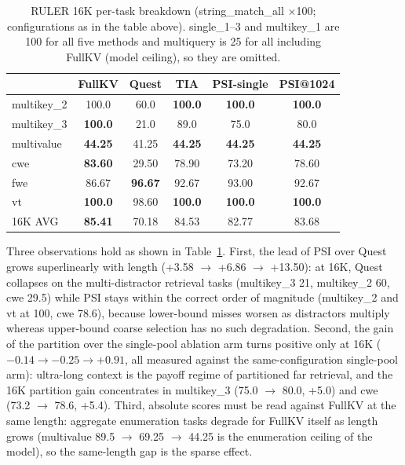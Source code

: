 \documentclass[11pt]{article}
\begin{document}
\begin{table}[h]\centering
\small\setlength{\tabcolsep}{4pt}
\caption{RULER 16K per-task breakdown (string\_match\_all $\times$100; configurations as in the table above). single\_1--3 and multikey\_1 are 100 for all five methods and multiquery is 25 for all including FullKV (model ceiling), so they are omitted.}
\label{tab:ruler16k}
\begin{tabular}{lccccc}
\toprule
 & FullKV & Quest & TIA & PSI-single & PSI@1024 \\
\midrule
multikey\_2 & 100.0 & 60.0 & \textbf{100.0} & \textbf{100.0} & \textbf{100.0} \\
multikey\_3 & \textbf{100.0} & 21.0 & 89.0 & 75.0 & 80.0 \\
multivalue & \textbf{44.25} & 41.25 & \textbf{44.25} & \textbf{44.25} & \textbf{44.25} \\
cwe & \textbf{83.60} & 29.50 & 78.90 & 73.20 & 78.60 \\
fwe & 86.67 & \textbf{96.67} & 92.67 & 93.00 & 92.67 \\
vt & \textbf{100.0} & 98.60 & \textbf{100.0} & \textbf{100.0} & \textbf{100.0} \\
16K AVG & \textbf{85.41} & 70.18 & 84.53 & 82.77 & 83.68 \\
\bottomrule
\end{tabular}
\end{table}

Three observations hold as shown in Table~\ref{tab:ruler16k}. First, the lead of PSI over Quest grows superlinearly with length (+3.58 $\rightarrow$ +6.86 $\rightarrow$ +13.50): at 16K, Quest collapses on the multi-distractor retrieval tasks (multikey\_3 21, multikey\_2 60, cwe 29.5) while PSI stays within the correct order of magnitude (multikey\_2 and vt at 100, cwe 78.6), because lower-bound misses worsen as distractors multiply whereas upper-bound coarse selection has no such degradation. Second, the gain of the partition over the single-pool ablation arm turns positive only at 16K ($-0.14 \rightarrow -0.25 \rightarrow +0.91$, all measured against the same-configuration single-pool arm): ultra-long context is the payoff regime of partitioned far retrieval, and the 16K partition gain concentrates in multikey\_3 (75.0 $\rightarrow$ 80.0, +5.0) and cwe (73.2 $\rightarrow$ 78.6, +5.4). Third, absolute scores must be read against FullKV at the same length: aggregate enumeration tasks degrade for FullKV itself as length grows (multivalue 89.5 $\rightarrow$ 69.25 $\rightarrow$ 44.25 is the enumeration ceiling of the model), so the same-length gap is the sparse effect.
\end{document}
